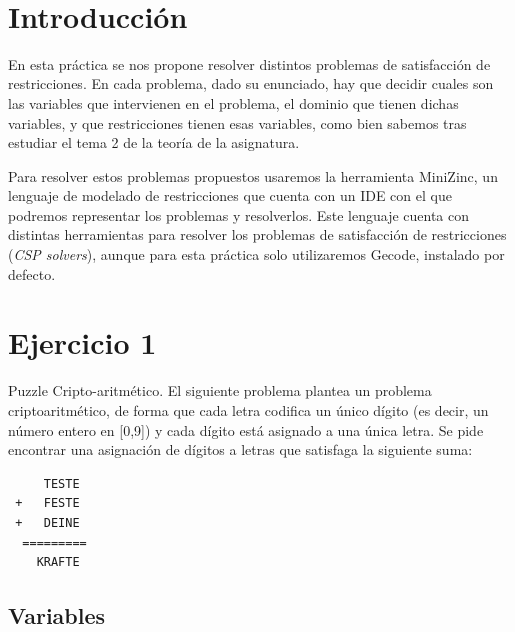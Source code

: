 \documentclass[11pt, spanish]{article}
\makeatletter
\let\thedate\@date
\makeatother
\begin{document}
\begin{titlepage}
    {\large \thedate}\\[0.5cm]
    {\doclicenseThis}
 	
    \vfill
    
\end{titlepage}




\section{Introducción}

En esta práctica se nos propone resolver distintos problemas de satisfacción de restricciones. En cada problema, dado su enunciado, hay que decidir cuales son las variables que intervienen en el problema, el dominio que tienen dichas variables, y que restricciones tienen esas variables, como bien sabemos tras estudiar el tema 2 de la teoría de la asignatura.

Para resolver estos problemas propuestos usaremos la herramienta MiniZinc, un lenguaje de modelado de restricciones que cuenta con un IDE con el que podremos representar los problemas y resolverlos. Este lenguaje cuenta con distintas herramientas para resolver los problemas de satisfacción de restricciones (\textit{CSP solvers}), aunque para esta práctica solo utilizaremos Gecode, instalado por defecto.

\section{Ejercicio 1}

Puzzle Cripto-aritmético. El siguiente problema plantea un problema criptoaritmético, de forma que cada letra codifica un único dígito (es decir, un número entero en [0,9]) y cada dígito está asignado a una única letra. Se pide encontrar una asignación de dígitos a letras que satisfaga la siguiente suma:

\begin{lstlisting}
     TESTE
 +   FESTE
 +   DEINE
  =========
    KRAFTE
\end{lstlisting}

\subsection{Variables}
\end{document}
